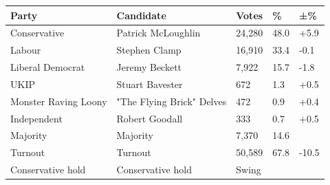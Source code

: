 \documentclass{article}
\begin{document}
\begin{tabular}{lllll}
\toprule
Party & Candidate & Votes & \% & ±\% \\
\midrule
Conservative & Patrick McLoughlin & 24,280 & 48.0 & +5.9 \\
Labour & Stephen Clamp & 16,910 & 33.4 & -0.1 \\
Liberal Democrat & Jeremy Beckett & 7,922 & 15.7 & -1.8 \\
UKIP & Stuart Bavester & 672 & 1.3 & +0.5 \\
Monster Raving Loony & "The Flying Brick" Delves & 472 & 0.9 & +0.4 \\
Independent & Robert Goodall & 333 & 0.7 & +0.5 \\
Majority & Majority & 7,370 & 14.6 &  \\
Turnout & Turnout & 50,589 & 67.8 & -10.5 \\
Conservative hold & Conservative hold & Swing &  &  \\
\bottomrule
\end{tabular}
\end{document}
